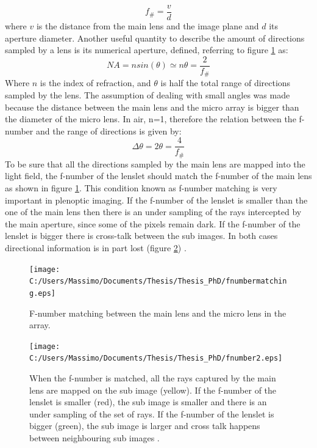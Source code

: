 \begin{equation}
\label{eq:f_num}
f_{\#} = \dfrac{v}{d}
\end{equation} 
where $v$ is the distance from the main lens and the image plane and $d$ its aperture diameter. Another useful quantity to describe the amount of directions sampled by a lens is its numerical aperture, defined, referring to figure \ref{fig:plenoptic5} as:
\begin{equation}
\label{eq:NA}
NA=n sin(\theta)\simeq n \theta =\dfrac{2}{f_{\#}}
\end{equation}
Where $n$ is the index of refraction, and $\theta$ is half the total range of directions sampled by the lens. The assumption of dealing with small angles was made because the distance between the main lens and the micro array is bigger than the diameter of the micro lens. In air, n=1, therefore the relation between the f-number and the range of directions is given by:
\begin{equation}
\label{eq:fnum1}
\Delta\theta= 2\theta=\dfrac{4}{f_{\#}}
\end{equation}
 To be sure that all the directions sampled by the main lens are mapped into the light field, the f-number of the lenslet should match the f-number of the main lens \cite{ng2005light} as shown in figure \ref{fig:plenoptic5}. This condition known as f-number matching is very important in plenoptic imaging. If the f-number of the lenslet is smaller than the one of the main lens then there is an under sampling of the rays intercepted by the main aperture, since some of the pixels remain dark. If the f-number of the lenslet is bigger there is cross-talk between the sub images. In both cases directional information is in part lost (figure \ref{fig:plenoptic7}) .
\begin{figure}[H]
	\centering
	\texttt{[image: C:/Users/Massimo/Documents/Thesis/Thesis\_PhD/fnumbermatching.eps]}
	\caption{\label{fig:plenoptic5}F-number matching between the main lens and the micro lens in the array.  }
\end{figure}
\begin{figure}[H]
	\centering
	\texttt{[image: C:/Users/Massimo/Documents/Thesis/Thesis\_PhD/fnumber2.eps]}
	\caption{\label{fig:plenoptic7}When the f-number is matched, all the rays captured by the main lens are mapped on the sub image (yellow). If the f-number of the lenslet is smaller (red), the sub image is smaller and there is an under sampling of the set of rays. If the f-number of the lenslet is bigger (green), the sub image is larger and cross talk happens between neighbouring sub images .  }
\end{figure}
\newpage
